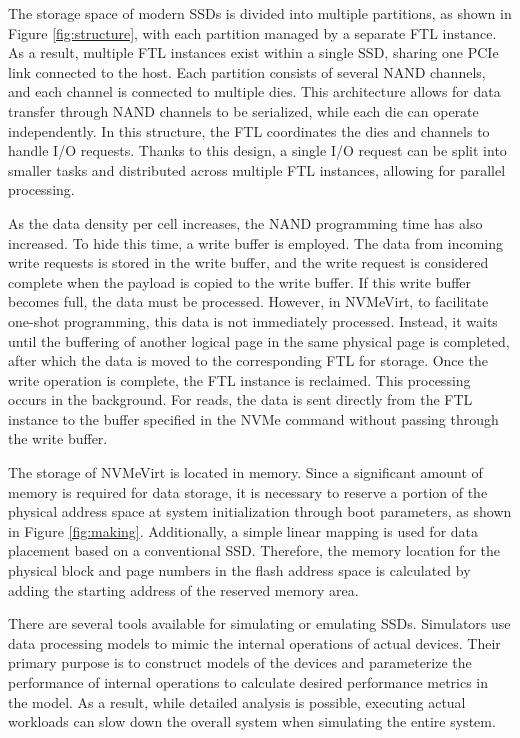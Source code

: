 The storage space of modern SSDs is divided into multiple partitions, as shown in Figure \ref{fig:structure}, with each partition managed by a separate FTL instance. 
As a result, multiple FTL instances exist within a single SSD, sharing one PCIe link connected to the host.
Each partition consists of several NAND channels, and each channel is connected to multiple dies. 
This architecture allows for data transfer through NAND channels to be serialized, while each die can operate independently. 
In this structure, the FTL coordinates the dies and channels to handle I/O requests.
Thanks to this design, a single I/O request can be split into smaller tasks and distributed across multiple FTL instances, allowing for parallel processing.

As the data density per cell increases, the NAND programming time has also increased.
To hide this time, a write buffer is employed. The data from incoming write requests is stored in the write buffer, and the write request is considered complete when the payload is copied to the write buffer. 
If this write buffer becomes full, the data must be processed. 
However, in NVMeVirt, to facilitate one-shot programming, this data is not immediately processed. 
Instead, it waits until the buffering of another logical page in the same physical page is completed, after which the data is moved to the corresponding FTL for storage.
Once the write operation is complete, the FTL instance is reclaimed. 
This processing occurs in the background. 
For reads, the data is sent directly from the FTL instance to the buffer specified in the NVMe command without passing through the write buffer.

The storage of NVMeVirt is located in memory. 
Since a significant amount of memory is required for data storage, it is necessary to reserve a portion of the physical address space at system initialization through boot parameters, as shown in Figure \ref{fig:making}. 
Additionally, a simple linear mapping is used for data placement based on a conventional SSD. 
Therefore, the memory location for the physical block and page numbers in the flash address space is calculated by adding the starting address of the reserved memory area.

There are several tools available for simulating or emulating SSDs. 
Simulators use data processing models to mimic the internal operations of actual devices. 
Their primary purpose is to construct models of the devices and parameterize the performance of internal operations to calculate desired performance metrics in the model.
As a result, while detailed analysis is possible, executing actual workloads can slow down the overall system when simulating the entire system.

